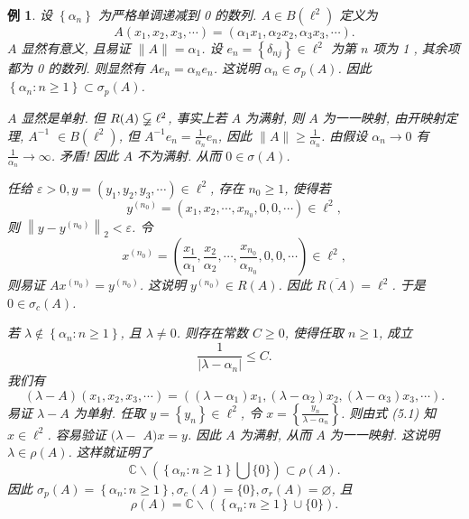 \documentclass[openany]{ctexbook}
\theoremstyle{kaiti}
\theoremstyle{normal}
\newtheorem{example}{例}[section]
\begin{document}
\begin{example}
设 $\left\{\alpha_n\right\}$ 为严格单调递减到 0 的数列. $A \in B\left(\ell^2\right)$ 定义为
$$
A\left(x_1, x_2, x_3, \cdots\right)=\left(\alpha_1 x_1, \alpha_2 x_2, \alpha_3 x_3, \cdots\right).
$$
$A$ 显然有意义, 且易证 $\|A\|=\alpha_1$. 设 $e_n=\left\{\delta_{n j}\right\} \in \ell^2$ 为第 $n$ 项为 1 , 其余项都为 0 的数列. 则显然有 $A e_n=\alpha_n e_n$. 这说明 $\alpha_n \in \sigma_{p}(A)$. 因此 $\left\{\alpha_n: n \geqslant 1\right\} \subset \sigma_{p}(A)$.

$A$ 显然是单射. 但 $R(A) \varsubsetneqq \ell^2$, 事实上若 $A$ 为满射, 则 $A$ 为一一映射, 由开映射定理, $A^{-1}$ $\in B\left(\ell^2\right)$, 但 $A^{-1} e_n=\frac{1}{\alpha_n} e_n$, 因此 $\|A\| \geqslant \frac{1}{\alpha_n}$. 由假设 $\alpha_n \rightarrow 0$ 有 $\frac{1}{\alpha_n} \rightarrow \infty$. 矛盾! 因此 $A$ 不为满射. 从而 $0 \in \sigma(A)$.

任给 $\varepsilon>0, y=\left(y_1, y_2, y_3, \cdots\right) \in \ell^2$, 存在 $n_0 \geqslant 1$, 使得若
$$
y^{\left(n_0\right)}=\left(x_1, x_2, \cdots, x_{n_0}, 0,0, \cdots\right) \in \ell^2,
$$
则 $\left\|y-y^{\left(n_0\right)}\right\|_2<\varepsilon$. 令
$$
x^{\left(n_0\right)}=\left(\frac{x_1}{\alpha_1}, \frac{x_2}{\alpha_2}, \cdots, \frac{x_{n_0}}{\alpha_{n_0}}, 0,0, \cdots\right) \in \ell^2,
$$
则易证 $A x^{\left(n_0\right)}=y^{\left(n_0\right)}$. 这说明 $y^{\left(n_0\right)} \in R(A)$. 因此 $\overline{R(A)}=\ell^2$. 于是 $0 \in \sigma_{c}(A)$.

若 $\lambda \notin\left\{\alpha_n: n \geqslant 1\right\}$, 且 $\lambda \neq 0$. 则存在常数 $C \geqslant 0$, 使得任取 $n \geqslant 1$, 成立
\begin{equation}
  \frac{1}{\left|\lambda-\alpha_n\right|} \leqslant C.
\end{equation}
我们有
$$
(\lambda-A)\left(x_1, x_2, x_3, \cdots\right)=\left(\left(\lambda-\alpha_1\right) x_1,\left(\lambda-\alpha_2\right) x_2,\left(\lambda-\alpha_3\right) x_3, \cdots\right).
$$
易证 $\lambda-A$ 为单射. 任取 $y=\left\{y_n\right\} \in \ell^2$, 令 $x=\left\{\frac{y_n}{\lambda-\alpha_n}\right\}$. 则由式 (5.1) 知 $x \in \ell^2$. 容易验证 $(\lambda-$ $A) x=y$. 因此 $A$ 为满射, 从而 $A$ 为一一映射. 这说明 $\lambda \in \rho(A)$. 这样就证明了
$$
\mathbb{C} \backslash\left(\left\{\alpha_n: n \geqslant 1\right\} \bigcup\{0\}\right) \subset \rho(A).
$$
因此 $\sigma_{p}(A)=\left\{\alpha_n: n \geqslant 1\right\}, \sigma_{c}(A)=\{0\}, \sigma_{r}(A)=\varnothing$, 且
$$
\rho(A)=\mathbb{C} \backslash\left(\left\{\alpha_n: n \geqslant 1\right\} \cup\{0\}\right).
$$
\end{example}
\end{document}
